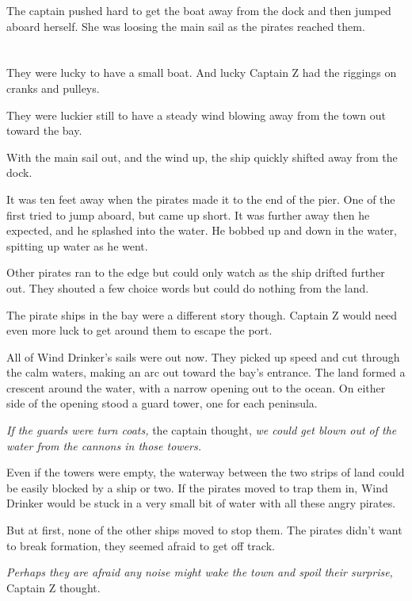 \documentclass[12pt]{extbook}
\begin{document}
  The captain pushed hard to get the boat away from the dock and then
  jumped aboard herself. She was loosing the main sail as the pirates
  reached them.
  
  \section{}\label{section-39}
  
  They were lucky to have a small boat. And lucky Captain Z had the
  riggings on cranks and pulleys.
  
  They were luckier still to have a steady wind blowing away from the town
  out toward the bay.
  
  With the main sail out, and the wind up, the ship quickly shifted away
  from the dock.
  
  It was ten feet away when the pirates made it to the end of the pier.
  One of the first tried to jump aboard, but came up short. It was further
  away then he expected, and he splashed into the water. He bobbed up and
  down in the water, spitting up water as he went.
  
  Other pirates ran to the edge but could only watch as the ship drifted
  further out. They shouted a few choice words but could do nothing from
  the land.
  
  The pirate ships in the bay were a different story though. Captain Z
  would need even more luck to get around them to escape the port.
  
  All of Wind Drinker's sails were out now. They picked up speed and cut
  through the calm waters, making an arc out toward the bay's entrance.
  The land formed a crescent around the water, with a narrow opening out
  to the ocean. On either side of the opening stood a guard tower, one for
  each peninsula.
  
  \emph{If the guards were turn coats,} the captain thought, \emph{we
  could get blown out of the water from the cannons in those towers.}
  
  Even if the towers were empty, the waterway between the two strips of
  land could be easily blocked by a ship or two. If the pirates moved to
  trap them in, Wind Drinker would be stuck in a very small bit of water
  with all these angry pirates.
  
  But at first, none of the other ships moved to stop them. The pirates
  didn't want to break formation, they seemed afraid to get off track.
  
  \emph{Perhaps they are afraid any noise might wake the town and spoil
  their surprise,} Captain Z thought.
  
\end{document}
